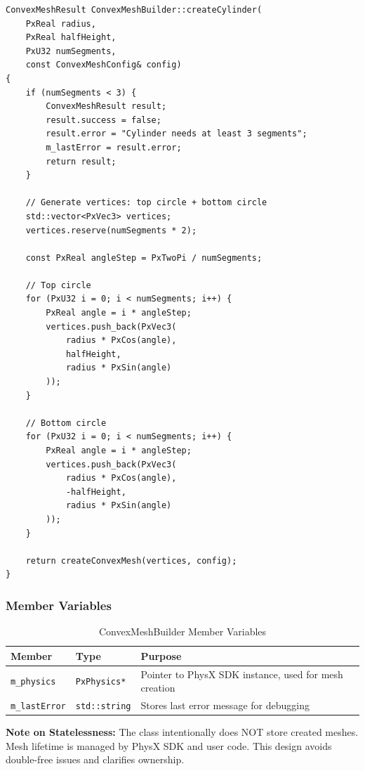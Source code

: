 \begin{lstlisting}[caption={Cylinder generation example}]
ConvexMeshResult ConvexMeshBuilder::createCylinder(
    PxReal radius,
    PxReal halfHeight,
    PxU32 numSegments,
    const ConvexMeshConfig& config)
{
    if (numSegments < 3) {
        ConvexMeshResult result;
        result.success = false;
        result.error = "Cylinder needs at least 3 segments";
        m_lastError = result.error;
        return result;
    }

    // Generate vertices: top circle + bottom circle
    std::vector<PxVec3> vertices;
    vertices.reserve(numSegments * 2);

    const PxReal angleStep = PxTwoPi / numSegments;

    // Top circle
    for (PxU32 i = 0; i < numSegments; i++) {
        PxReal angle = i * angleStep;
        vertices.push_back(PxVec3(
            radius * PxCos(angle),
            halfHeight,
            radius * PxSin(angle)
        ));
    }

    // Bottom circle
    for (PxU32 i = 0; i < numSegments; i++) {
        PxReal angle = i * angleStep;
        vertices.push_back(PxVec3(
            radius * PxCos(angle),
            -halfHeight,
            radius * PxSin(angle)
        ));
    }

    return createConvexMesh(vertices, config);
}
\end{lstlisting}

\subsubsection{Member Variables}

\begin{table}[h]
\centering
\begin{tabular}{|l|l|p{7cm}|}
\hline
\textbf{Member} & \textbf{Type} & \textbf{Purpose} \\
\hline
\texttt{m\_physics} & \texttt{PxPhysics*} & Pointer to PhysX SDK instance, used for mesh creation \\
\hline
\texttt{m\_lastError} & \texttt{std::string} & Stores last error message for debugging \\
\hline
\end{tabular}
\caption{ConvexMeshBuilder Member Variables}
\end{table}

\textbf{Note on Statelessness:} The class intentionally does NOT store created meshes. Mesh lifetime is managed by PhysX SDK and user code. This design avoids double-free issues and clarifies ownership.

